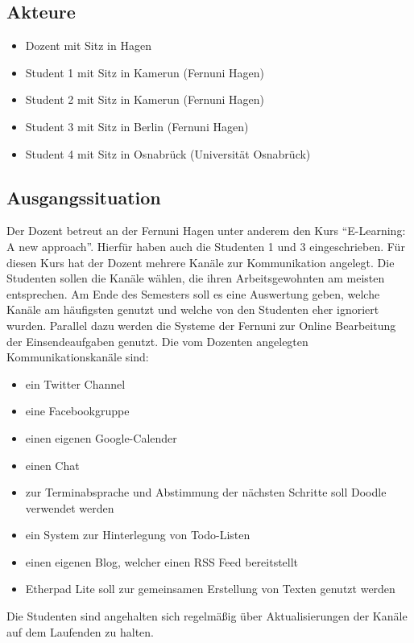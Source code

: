 \subsection{Akteure}

\begin{itemize}
 \item Dozent mit Sitz in Hagen
 \item Student 1 mit Sitz in Kamerun (Fernuni Hagen)
 \item Student 2 mit Sitz in Kamerun (Fernuni Hagen)
 \item Student 3 mit Sitz in Berlin (Fernuni Hagen)
 \item Student 4 mit Sitz in Osnabrück (Universität Osnabrück) 
\end{itemize}

\subsection{Ausgangssituation}\label{section:ausgangssituation}
Der Dozent betreut an der Fernuni Hagen unter anderem den Kurs "`E-Learning: A new approach"'. Hierfür haben auch die Studenten 1 und 3 eingeschrieben. Für diesen Kurs hat der Dozent mehrere Kanäle zur Kommunikation angelegt. Die Studenten sollen die Kanäle wählen, die ihren Arbeitsgewohnten am meisten entsprechen. Am Ende des Semesters soll es eine Auswertung geben, welche Kanäle am häufigsten genutzt und welche von den Studenten eher ignoriert wurden. Parallel dazu werden die Systeme der Fernuni zur Online Bearbeitung der Einsendeaufgaben genutzt. Die vom Dozenten angelegten Kommunikationskanäle sind:

\begin{itemize}
 \item ein Twitter Channel
 \item eine Facebookgruppe
 \item einen eigenen Google-Calender
 \item einen Chat
 \item zur Terminabsprache und Abstimmung der nächsten Schritte soll Doodle verwendet werden
 \item ein System zur Hinterlegung von Todo-Listen
 \item einen eigenen Blog, welcher einen RSS Feed bereitstellt 
 \item Etherpad Lite soll zur gemeinsamen Erstellung von Texten genutzt werden
\end{itemize}

Die Studenten sind angehalten sich regelmäßig über Aktualisierungen der Kanäle auf dem Laufenden zu halten.

